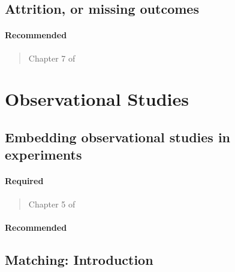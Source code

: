 \documentclass[12pt]{article}
\begin{document}
\subsection{Attrition, or missing outcomes}

\paragraph*{Recommended}

\begin{verse} Chapter 7 of  \end{verse}

\begin{verse}  \end{verse}

\begin{verse}  \end{verse}

\section{Observational Studies}

\subsection{Embedding observational studies in experiments}

\paragraph*{Required}

\begin{verse} Chapter 5 of  \end{verse}

\paragraph*{Recommended}

\begin{verse}  \end{verse}

\begin{verse}  \end{verse}

\subsection{Matching: Introduction}
\end{document}
